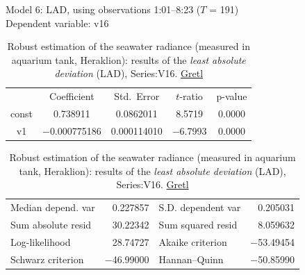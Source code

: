 \documentclass[10pt, a4paper]{article}
\begin{document}
\begin{appendices}
\begin{table}
	\caption{Robust estimation of the seawater radiance (measured in aquarium tank, Heraklion): results of the \textit{least absolute deviation} (LAD), Series:V16. \href{http://gretl.sourceforge.net/}{Gretl}}
	\begin{center}
		Model 6: LAD, using observations 1:01--8:23 ($T$ = 191)\\
		Dependent variable: v16\\
	\vspace{1em}

	\begin{tabular}{|c c c c c|}
		  & {Coefficient} & {Std.\ Error} & {$t$-ratio} & {p-value} \\[1ex]
		const &   0.738911 &     0.0862011 &       8.5719 &         0.0000 \\
		v1 &   $-$0.000775186 &     0.000114010 &       $-$6.7993 &         0.0000 \\
	\end{tabular}

	\vspace{1ex}
	\begin{tabular}{lrlr}
		Median depend. var &  0.227857 & S.D. dependent var &  0.205031 \\
		Sum absolute resid &  30.22342 & Sum squared resid &  8.059632 \\
		Log-likelihood &  28.74727 & Akaike criterion & $-$53.49454 \\
		Schwarz criterion & $-$46.99000 & Hannan--Quinn & $-$50.85990 \\
	\end{tabular}
	\label{tab:12}
	\end{center}
\end{table}
\pagebreak
\newpage


\end{appendices}
\end{document}
